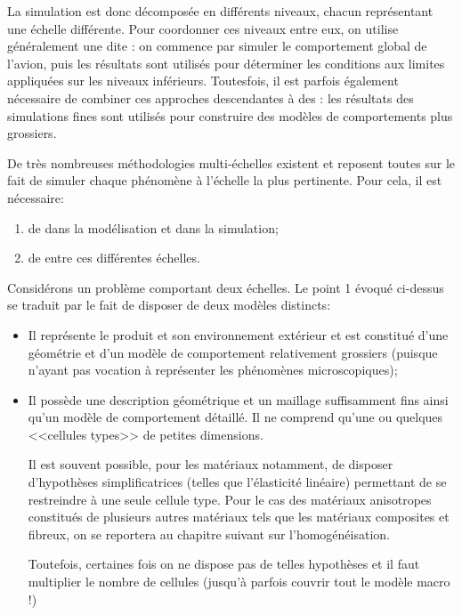 La simulation est donc décomposée en différents niveaux, chacun représentant une échelle
différente. Pour coordonner ces niveaux entre eux, on utilise généralement une
 dite : 
on commence par simuler  le comportement global de l'avion, puis les résultats sont utilisés pour 
déterminer les conditions aux limites appliquées sur les niveaux inférieurs. 
Toutesfois, il est parfois également nécessaire de combiner ces approches descendantes
à des : 
les résultats des simulations fines sont utilisés pour construire des modèles de comportements 
plus grossiers.

\medskip
De très nombreuses méthodologies multi-échelles existent et reposent
toutes sur le fait de simuler chaque phénomène à l'échelle la plus
pertinente. 
Pour cela, il est nécessaire:
\begin{enumerate}
   \item de  dans la modélisation et dans la simulation; 
   \item de  entre ces différentes échelles.
\end{enumerate}

\medskip
Considérons un problème comportant deux échelles.
Le point 1 évoqué ci-dessus se traduit par le fait de disposer de deux modèles
distincts:
\begin{itemize}
   \item {}

	Il représente le produit et son environnement extérieur et est constitué
	d'une géométrie et d'un modèle de comportement relativement grossiers
	(puisque n'ayant pas vocation à représenter les phénomènes microscopiques);
   \item {}

	Il possède une description géométrique et un maillage suffisamment fins ainsi qu'un 
	modèle de comportement détaillé. Il ne comprend qu'une ou quelques
	<<cellules types>> de petites dimensions.

	Il est souvent possible, pour les matériaux notamment, de disposer d'hypothèses
	simplificatrices (telles que l'élasticité linéaire) permettant de se restreindre à une
	seule cellule type.
	Pour le cas des matériaux anisotropes constitués de plusieurs autres matériaux tels
	que les matériaux composites et fibreux, on se reportera au chapitre suivant sur l'homogénéisation.

	Toutefois, certaines fois on ne dispose pas de telles hypothèses et il faut multiplier le nombre
	de cellules (jusqu'à parfois couvrir tout le modèle macro !)
\end{itemize}

